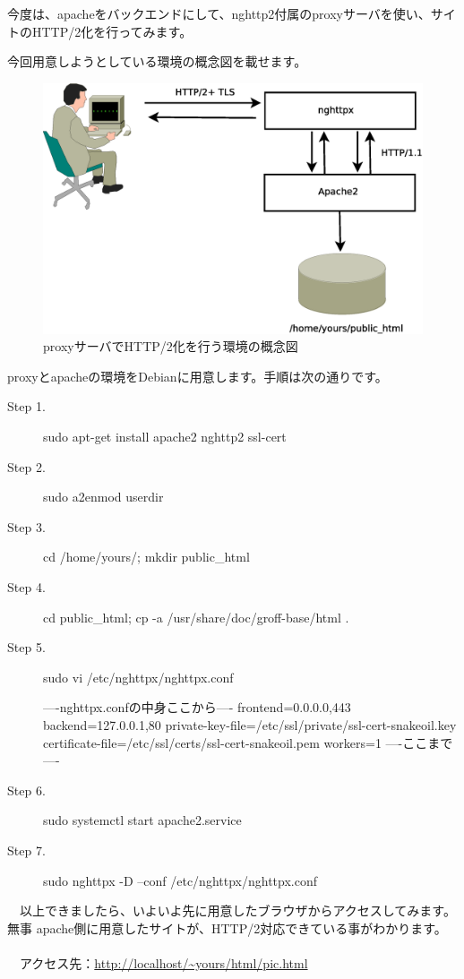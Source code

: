\documentclass[mingoth,a4paper]{jsarticle}
\begin{document}
 今度は、apacheをバックエンドにして、nghttp2付属のproxyサーバを使い、サイトのHTTP/2化を行ってみます。
  
 今回用意しようとしている環境の概念図を載せます。

\begin{figure}[H]
\begin{center}
 \includegraphics[width=0.5\hsize]{image201507/nghttpx-apache-proxying.eps}
\end{center}
\caption{proxyサーバでHTTP/2化を行う環境の概念図}
\end{figure}
  
 proxyとapacheの環境をDebianに用意します。手順は次の通りです。

\begin{description}
\item [Step 1.] sudo apt-get install apache2 nghttp2 ssl-cert
\item [Step 2.] sudo a2enmod userdir
\item [Step 3.] cd /home/yours/; mkdir public\_html
\item [Step 4.] cd public\_html; cp -a /usr/share/doc/groff-base/html .
\item [Step 5.] sudo vi /etc/nghttpx/nghttpx.conf\\
\begin{commandline}
 ----nghttpx.confの中身ここから----
frontend=0.0.0.0,443 
backend=127.0.0.1,80 
private-key-file=/etc/ssl/private/ssl-cert-snakeoil.key 
certificate-file=/etc/ssl/certs/ssl-cert-snakeoil.pem 
workers=1 
----ここまで----
\end{commandline}
\item [Step 6.] sudo systemctl start apache2.service
\item [Step 7.] sudo nghttpx -D --conf /etc/nghttpx/nghttpx.conf
\end{description}

　以上できましたら、いよいよ先に用意したブラウザからアクセスしてみます。無事 apache側に用意したサイトが、HTTP/2対応できている事がわかります。\\
\\
　アクセス先：\url{http://localhost/~yours/html/pic.html}\\
\end{document}
